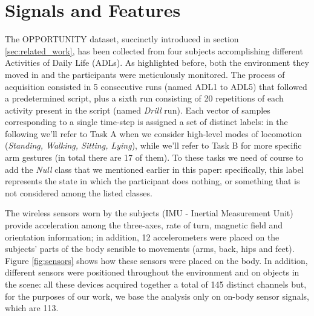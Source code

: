 \section{Signals and Features}
\label{sec:model}

The OPPORTUNITY dataset, succinctly introduced in section \ref{sec:related_work}, has been collected from four subjects accomplishing different Activities of Daily Life (ADLs). As highlighted before, both the environment they moved in and the participants were meticulously monitored.
The process of acquisition consisted in 5 consecutive runs (named ADL1 to ADL5) that followed a predetermined script, plus a sixth run consisting of 20 repetitions of each activity present in the script (named \textit{Drill} run). Each vector of samples corresponding to a single time-step is assigned a set of distinct labels: in the following we'll refer to Task A when we consider high-level modes of locomotion (\textit{Standing, Walking, Sitting, Lying}), while we'll refer to Task B for more specific arm gestures (in total there are 17 of them). To these tasks we need of course to add the \textit{Null} class that we mentioned earlier in this paper: specifically, this label represents the state in which the participant does nothing, or something that is not considered among the listed classes.

The wireless sensors worn by the subjects (IMU - Inertial Measurement Unit) provide acceleration among the three-axes, rate of turn, magnetic field and orientation information; in addition, 12 accelerometers were placed on the subjects' parts of the body sensible to movements (arms, back, hips and feet). Figure \ref{fig:sensors} shows how these sensors were placed on the body. In addition, different sensors were positioned throughout the environment and on objects in the scene: all these devices acquired together a total of 145 distinct channels but, for the purposes of our work, we base the analysis only on on-body sensor signals, which are 113.

